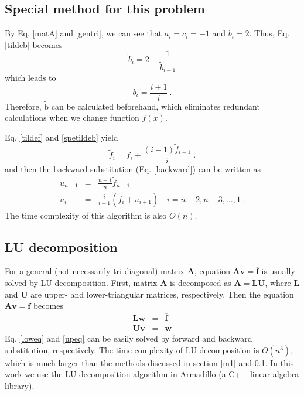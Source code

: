 \documentclass{article}
\begin{document}
	\subsection{Special method for this problem}\label{m2}
	By Eq. \ref{matA} and \ref{gentri}, we can see that $a_i=c_i=-1$ and $b_i=2$. 
	Thus, Eq. \ref{tildeb} becomes 
	\begin{equation}
	\tilde{b}_i=2-\frac{1}{\tilde{b}_{i-1}}
	\end{equation}
	which leads to 
	\begin{equation}\label{spetildeb}
	\tilde{b}_i=\frac{i+1}{i}\ . 
	\end{equation}
	Therefore, $\tilde{\mathrm{b}}$ can be calculated beforehand, 
	which eliminates redundant calculations when we change function $f(x)$.
	\par 
	Eq. \ref{tildef} and \ref{spetildeb} yield 
	\begin{equation}
	\tilde{f}_i=\overline{f}_i+\frac{(i-1)\tilde{f}_{i-1}}{i}\ .
	\end{equation}
	and then the backward substitution (Eq. \ref{backward}) can be written as
	\begin{eqnarray}
	\nonumber
	u_{n-1}&=&\frac{n-1}{n}\tilde{f}_{n-1} \\
	u_{i}&=&\frac{i}{i+1}\left(\tilde{f}_{i}+u_{i+1}\right)\quad i=n-2,n-3,\dots,1\ .
	\end{eqnarray}
	The time complexity of this algorithm is also $O(n)$. 
	
	
	\subsection{LU decomposition}\label{m3}
	For a general (not necessarily tri-diagonal) matrix $\mathbf{A}$, 
	equation $\mathbf{A}\mathbf{v} = \overline{\mathbf{f}}$	is usually solved by LU decomposition. 
	First, matrix $\mathbf{A}$ is decomposed as $\mathbf{A}=\mathbf{L}\mathbf{U}$, 
	where $\mathbf{L}$ and $\mathbf{U}$ are upper- and lower-triangular matrices, respectively. 
	Then the equation $\mathbf{A}\mathbf{v} = \overline{\mathbf{f}}$ becomes 
	\begin{eqnarray}
	\mathbf{L}\mathbf{w} &=& \overline{\mathbf{f}} \label{loweq}
	\\
	\mathbf{U}\mathbf{v} &=& \mathbf{w} \label{upeq}
	\end{eqnarray}
	Eq. \ref{loweq} and \ref{upeq} can be easily solved by forward and backward substitution, respectively. 
	The time complexity of LU decomposition is $O(n^3)$, 
	which is much larger than the methods discussed in section \ref{m1} and \ref{m2}.
	In this work we use the LU decomposition algorithm in Armadillo (a C++ linear algebra library). 
	
\end{document}
